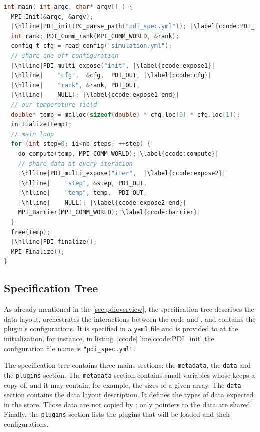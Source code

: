 \begin{lstlisting}[float, label=ccode, language=c, caption=\pdi instrumentation of the C simulation code]
int main( int argc, char* argv[] ) {
  MPI_Init(&argc, &argv);
  |\hlline|PDI_init(PC_parse_path("pdi_spec.yml")); |\label{ccode:PDI_init}|
  int rank; PDI_Comm_rank(MPI_COMM_WORLD, &rank);
  config_t cfg = read_config("simulation.yml");
  // share one-off configuration
  |\hlline|PDI_multi_expose("init", |\label{ccode:expose1}|
  |\hlline|    "cfg",  &cfg,  PDI_OUT, |\label{ccode:cfg}|
  |\hlline|    "rank", &rank, PDI_OUT,
  |\hlline|    NULL); |\label{ccode:expose1-end}|
  // our temperature field
  double* temp = malloc(sizeof(double) * cfg.loc[0] * cfg.loc[1]);
  initialize(temp);
  // main loop
  for (int step=0; ii<nb_steps; ++step) {
    do_compute(temp, MPI_COMM_WORLD);|\label{ccode:compute}|
    // share data at every iteration
    |\hlline|PDI_multi_expose("iter",  |\label{ccode:expose2}|
    |\hlline|    "step", &step, PDI_OUT,
    |\hlline|    "temp", temp,  PDI_OUT,
    |\hlline|    NULL); |\label{ccode:expose2-end}|
    MPI_Barrier(MPI_COMM_WORLD);|\label{ccode:barrier}|
  }
  free(temp);
  |\hlline|PDI_finalize();
  MPI_Finalize();
}
\end{lstlisting}

\subsection{\pdi Specification Tree}
As already mentioned in the \ref{sec:pdioverview}, the specification tree describes the data layout, orchestrates the interactions between the code and \pdi, and contains the plugin's configurations. It is specified in a \texttt{yaml} file and is provided to \pdi at the initialization, for instance, in listing~\ref{ccode} line\ref{ccode:PDI_init} the configuration file name is \texttt{"pdi\_spec.yml"}. 

The specification tree contains three mains sections: the \texttt{metadata}, the \texttt{data} and the \texttt{plugins} section. The \texttt{metadata} section contains small variables whose \pdi keeps a copy of, and it may contain, for example, the sizes of a given array. The \texttt{data} section contains the data layout description. It defines the types of data expected in the store. Those data are not copied by \pdi; only pointers to the data are shared. Finally, the \texttt{plugins} section lists the plugins that will be loaded and their configurations. 

